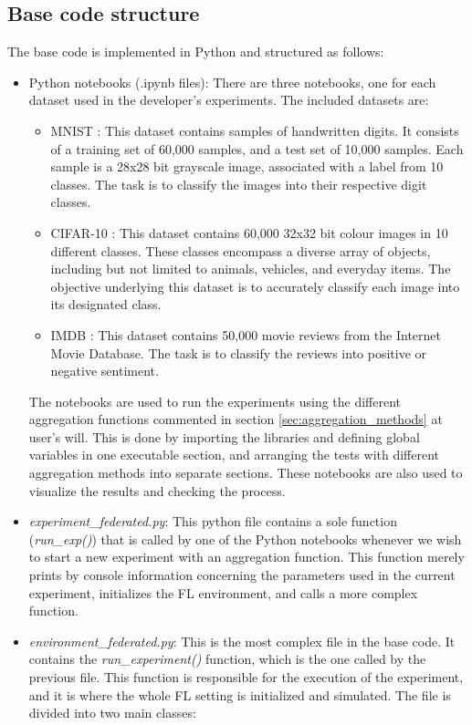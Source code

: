 \subsection{Base code structure} \label{sec:base_code}
The base code is implemented in Python and structured as follows:
\begin{itemize}
        \item Python notebooks (.ipynb files): There are three notebooks, one for each dataset used in the developer's experiments. The included datasets are:
        \begin{itemize}
                \item MNIST \cite{MNIST}: This dataset contains samples of handwritten digits. It consists of a training set of 60,000 samples, and a test set of 10,000 samples. Each sample is a 28x28 bit grayscale image, associated with a label from 10 classes. The task is to classify the images into their respective digit classes.
                \item CIFAR-10 \cite{CIFAR10}: This dataset contains 60,000 32x32 bit colour images in 10 different classes. These classes encompass a diverse array of objects, including but not limited to animals, vehicles, and everyday items. The objective underlying this dataset is to accurately classify each image into its designated class.
                \item IMDB \cite{IMDB}: This dataset contains 50,000 movie reviews from the Internet Movie Database. The task is to classify the reviews into positive or negative sentiment.
        \end{itemize}
        The notebooks are used to run the experiments using the different aggregation functions commented in section \ref{sec:aggregation_methods} at user's will. This is done by importing the libraries and defining global variables in one executable section, and arranging the tests with different aggregation methods into separate sections. These notebooks are also used to visualize the results and checking the process.
        \item \textit{experiment\_federated.py}: This python file contains a sole function (\textit{run\_exp()}) that is called by one of the Python notebooks whenever we wish to start a new experiment with an aggregation function. This function merely prints by console information concerning the parameters used in the current experiment, initializes the FL environment, and calls a more complex function.
        \item \textit{environment\_federated.py}: This is the most complex file in the base code. It contains the \textit{run\_experiment()} function, which is the one called by the previous file. This function is responsible for the execution of the experiment, and it is where the whole FL setting is initialized and simulated. The file is divided into two main classes:

\end{itemize}

